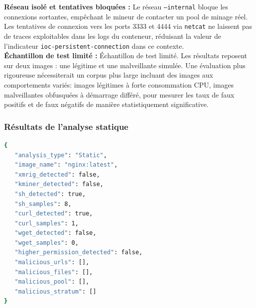 \noindent \textbf{Réseau isolé et tentatives bloquées :} Le réseau \texttt{--internal} bloque les connexions sortantes, empêchant le mineur de contacter un pool de minage réel. Les tentatives de connexion vers les ports 3333 et 4444 via \texttt{netcat} ne laissent pas de traces exploitables dans les logs du conteneur, réduisant la valeur de l'indicateur \texttt{ioc-persistent-connection} dans ce contexte. \\

\noindent \textbf{Échantillon de test limité :} Échantillon de test limité. Les résultats reposent sur deux images : une légitime et une malveillante simulée. Une évaluation plus rigoureuse nécessiterait un corpus plus large incluant des images aux comportements variés: images légitimes à forte consommation CPU, images malveillantes obfusquées à démarrage différé, pour mesurer les taux de faux positifs et de faux négatifs de manière statistiquement significative.

\subsubsection{Résultats de l'analyse statique}

\begin{lstlisting}[language=bash, caption=Retour rapport nginx:latest]
{
   "analysis_type": "Static",
   "image_name": "nginx:latest",
   "xmrig_detected": false,
   "kminer_detected": false,
   "sh_detected": true,
   "sh_samples": 8,
   "curl_detected": true,
   "curl_samples": 1,
   "wget_detected": false,
   "wget_samples": 0,
   "higher_permission_detected": false,
   "malicious_urls": [],
   "malicious_files": [],
   "malicious_pool": [],
   "malicious_stratum": []
}

\end{lstlisting}

